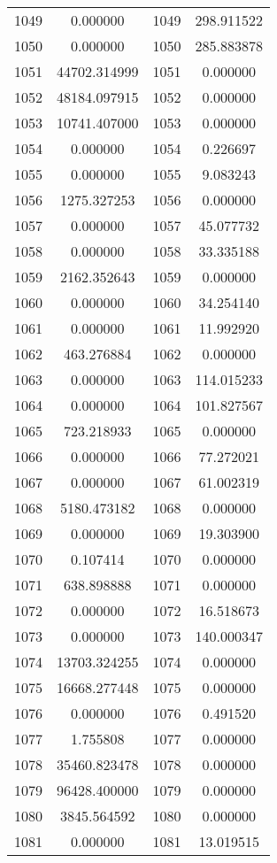 \documentclass[12pt]{article}
\begin{document}
\begin{longtable}{@{}cccc@{}}
1049 & 0.000000 & 1049 & 298.911522 \\
1050 & 0.000000 & 1050 & 285.883878 \\
1051 & 44702.314999 & 1051 & 0.000000 \\
1052 & 48184.097915 & 1052 & 0.000000 \\
1053 & 10741.407000 & 1053 & 0.000000 \\
1054 & 0.000000 & 1054 & 0.226697 \\
1055 & 0.000000 & 1055 & 9.083243 \\
1056 & 1275.327253 & 1056 & 0.000000 \\
1057 & 0.000000 & 1057 & 45.077732 \\
1058 & 0.000000 & 1058 & 33.335188 \\
1059 & 2162.352643 & 1059 & 0.000000 \\
1060 & 0.000000 & 1060 & 34.254140 \\
1061 & 0.000000 & 1061 & 11.992920 \\
1062 & 463.276884 & 1062 & 0.000000 \\
1063 & 0.000000 & 1063 & 114.015233 \\
1064 & 0.000000 & 1064 & 101.827567 \\
1065 & 723.218933 & 1065 & 0.000000 \\
1066 & 0.000000 & 1066 & 77.272021 \\
1067 & 0.000000 & 1067 & 61.002319 \\
1068 & 5180.473182 & 1068 & 0.000000 \\
1069 & 0.000000 & 1069 & 19.303900 \\
1070 & 0.107414 & 1070 & 0.000000 \\
1071 & 638.898888 & 1071 & 0.000000 \\
1072 & 0.000000 & 1072 & 16.518673 \\
1073 & 0.000000 & 1073 & 140.000347 \\
1074 & 13703.324255 & 1074 & 0.000000 \\
1075 & 16668.277448 & 1075 & 0.000000 \\
1076 & 0.000000 & 1076 & 0.491520 \\
1077 & 1.755808 & 1077 & 0.000000 \\
1078 & 35460.823478 & 1078 & 0.000000 \\
1079 & 96428.400000 & 1079 & 0.000000 \\
1080 & 3845.564592 & 1080 & 0.000000 \\
1081 & 0.000000 & 1081 & 13.019515 \\

\end{longtable}
\end{document}
